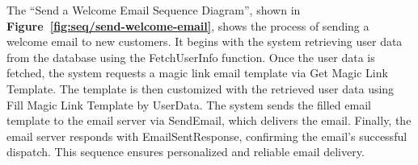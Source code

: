 The ``Send a Welcome Email Sequence Diagram'', shown in \textbf{Figure~\ref{fig:seq/send-welcome-email}}, shows the process of sending a welcome email to new customers. It begins with the system retrieving user data from the database using the FetchUserInfo function. Once the user data is fetched, the system requests a magic link email template via Get Magic Link Template. The template is then customized with the retrieved user data using Fill Magic Link Template by UserData. The system sends the filled email template to the email server via SendEmail, which delivers the email. Finally, the email server responds with EmailSentResponse, confirming the email's successful dispatch. This sequence ensures personalized and reliable email delivery.
